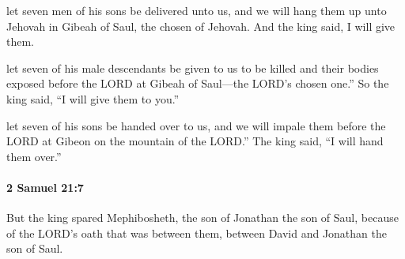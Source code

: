 			\begin{versebox}
					\item[BHS] 
					\item[ASV] let seven men of his sons be delivered unto us, and we will hang them up unto Jehovah in Gibeah of Saul, the chosen of Jehovah. And the king said, I will give them.
					\item[NIV] let seven of his male descendants be given to us to be killed and their bodies exposed before the LORD at Gibeah of Saul—the LORD’s chosen one.” So the king said, “I will give them to you.”
					\item[NRSV] let seven of his sons be handed over to us, and we will impale them before the LORD at Gibeon on the mountain of the LORD.” The king said, “I will hand them over.”
			\end{versebox}

		\paragraph{2 Samuel 21:7} %
			\label{2SAMUEL-21-7}

			But the king spared Mephibosheth, the son of Jonathan the son of Saul, because of the LORD’s oath that was between them, between David and Jonathan the son of Saul.

